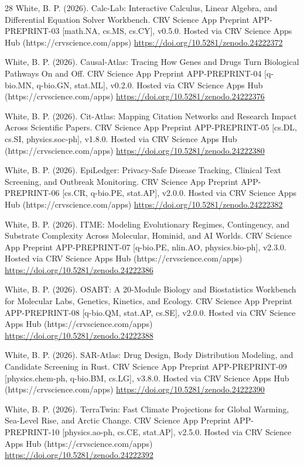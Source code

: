 \documentclass[10pt,letterpaper]{article}
\begin{document}
\begin{thebibliography}{28}
 White, B. P. (2026). Calc-Lab: Interactive Calculus, Linear Algebra, and Differential Equation Solver Workbench. CRV Science App Preprint APP-PREPRINT-03 [math.NA, cs.MS, cs.CY], v0.5.0. Hosted via CRV Science Apps Hub (https://crvscience.com/apps) \url{https://doi.org/10.5281/zenodo.24222372}

 White, B. P. (2026). Causal-Atlas: Tracing How Genes and Drugs Turn Biological Pathways On and Off. CRV Science App Preprint APP-PREPRINT-04 [q-bio.MN, q-bio.GN, stat.ML], v0.2.0. Hosted via CRV Science Apps Hub (https://crvscience.com/apps) \url{https://doi.org/10.5281/zenodo.24222376}

 White, B. P. (2026). Cit-Atlas: Mapping Citation Networks and Research Impact Across Scientific Papers. CRV Science App Preprint APP-PREPRINT-05 [cs.DL, cs.SI, physics.soc-ph], v1.8.0. Hosted via CRV Science Apps Hub (https://crvscience.com/apps) \url{https://doi.org/10.5281/zenodo.24222380}

 White, B. P. (2026). EpiLedger: Privacy-Safe Disease Tracking, Clinical Text Screening, and Outbreak Monitoring. CRV Science App Preprint APP-PREPRINT-06 [cs.CR, q-bio.PE, stat.AP], v2.0.0. Hosted via CRV Science Apps Hub (https://crvscience.com/apps) \url{https://doi.org/10.5281/zenodo.24222382}

 White, B. P. (2026). ITME: Modeling Evolutionary Regimes, Contingency, and Substrate Complexity Across Molecular, Hominid, and AI Worlds. CRV Science App Preprint APP-PREPRINT-07 [q-bio.PE, nlin.AO, physics.bio-ph], v2.3.0. Hosted via CRV Science Apps Hub (https://crvscience.com/apps) \url{https://doi.org/10.5281/zenodo.24222386}

 White, B. P. (2026). OSABT: A 20-Module Biology and Biostatistics Workbench for Molecular Labs, Genetics, Kinetics, and Ecology. CRV Science App Preprint APP-PREPRINT-08 [q-bio.QM, stat.AP, cs.SE], v2.0.0. Hosted via CRV Science Apps Hub (https://crvscience.com/apps) \url{https://doi.org/10.5281/zenodo.24222388}

 White, B. P. (2026). SAR-Atlas: Drug Design, Body Distribution Modeling, and Candidate Screening in Rust. CRV Science App Preprint APP-PREPRINT-09 [physics.chem-ph, q-bio.BM, cs.LG], v3.8.0. Hosted via CRV Science Apps Hub (https://crvscience.com/apps) \url{https://doi.org/10.5281/zenodo.24222390}

 White, B. P. (2026). TerraTwin: Fast Climate Projections for Global Warming, Sea-Level Rise, and Arctic Change. CRV Science App Preprint APP-PREPRINT-10 [physics.ao-ph, cs.CE, stat.AP], v2.5.0. Hosted via CRV Science Apps Hub (https://crvscience.com/apps) \url{https://doi.org/10.5281/zenodo.24222392}


\end{thebibliography}
\end{document}
